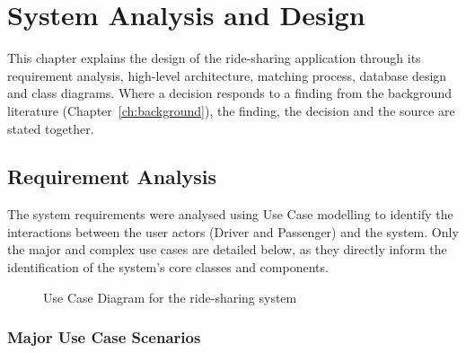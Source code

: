 \chapter{System Analysis and Design}
\label{ch:design}

This chapter explains the design of the ride-sharing application through its requirement analysis, high-level architecture, matching process, database design and class diagrams. Where a decision responds to a finding from the background literature (Chapter~\ref{ch:background}), the finding, the decision and the source are stated together.

\section{Requirement Analysis}

The system requirements were analysed using Use Case modelling to identify the interactions between the user actors (Driver and Passenger) and the system. Only the major and complex use cases are detailed below, as they directly inform the identification of the system's core classes and components.

\begin{figure}[htbp]
  \centering
  \caption{Use Case Diagram for the ride-sharing system}
  \label{fig:usecase}
\end{figure}

\subsection{Major Use Case Scenarios}

